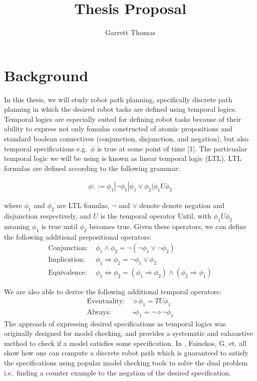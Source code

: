 \documentclass[11pt,a4paper]{article}
\title{Thesis Proposal}
\author{Garrett Thomas}
\begin{document}
\maketitle

\section{Background}
In this thesis, we will study robot path planning, specifically discrete path planning in which the desired robot tasks are defined using temporal logics. Temporal logics are especially suited for defining robot tasks because of their ability to express not only fomulas constructed of atomic propositions and standard boolean connectives (conjunction, disjunction, and negation), but also temporal specifications e.g.\ $\phi$ is true at some point of time [1]. The particualar temporal logic we will be using is known as linear temporal logic (LTL). LTL formulas are defined according to the following grammar:

\begin{align*}
    \phi ::= \phi_1 | \neg \phi_1 | \phi_1  \lor \phi_2 | \phi_1 U \phi_2
\end{align*}

where $\phi_1$ and $\phi_2$ are LTL fomulas, $\neg$ and $\lor$ denote denote negation and disjunction respectively, and $U$ is the temporal operator Until, with $\phi_1 U \phi_2$ meaning $\phi_1$ is true until $\phi_2$ becomes true. Given these operators, we can define the following additional prepositional operators:
\begin{align*}
    \text{Conjunction: }&  \phi_1  \land \phi_2 = \neg(\neg \phi_1 \lor \neg \phi_2) \\
    \text{Implication: }& \phi_1 \Rightarrow \phi_2 = \neg \phi_1 \lor \phi_2 \\
    \text{Equivalence: }& \phi_1 \Leftrightarrow \phi_2 = (\phi_1 \Rightarrow \phi_2) \land (\phi_2 \Rightarrow \phi_1)
\end{align*}

We are also able to derive the following additional temporal operators:
\begin{align*}
    \text{Eventuality: }& \diamond \phi_1 = T U \phi_1 \\
    \text{Always: }& \square \phi_1 = \neg \diamond \neg \phi_1
\end{align*}
The approach of expressing desired specifications as temporal logics was originally designed for model checking, and provides a systematic and exhaustive method to check if a model satisfies some specification. In \cite{fainekos05}, Fainekos, G. et. all show how one can compute a discrete robot path which is guaranteed to satisfy the specifications using popular model checking tools to solve the dual problem i.e.\ finding a counter example to the negation of the desired specification. 
\end{document}
